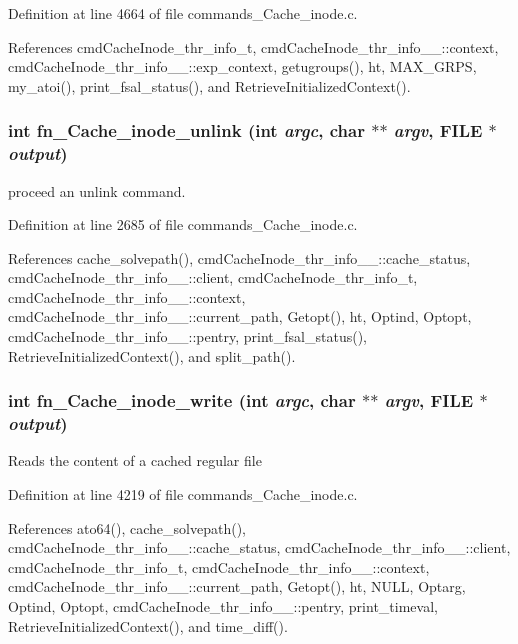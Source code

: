 Definition at line 4664 of file commands\_\-Cache\_\-inode.c.

References cmd\-Cache\-Inode\_\-thr\_\-info\_\-t, cmd\-Cache\-Inode\_\-thr\_\-info\_\-\_\-::context, cmd\-Cache\-Inode\_\-thr\_\-info\_\-\_\-::exp\_\-context, getugroups(), ht, MAX\_\-GRPS, my\_\-atoi(), print\_\-fsal\_\-status(), and Retrieve\-Initialized\-Context().
\subsubsection{\setlength{\rightskip}{0pt plus 5cm}int fn\_\-Cache\_\-inode\_\-unlink (int {\em argc}, char $\ast$$\ast$ {\em argv}, FILE $\ast$ {\em output})}\label{commands__Cache__inode_8c_a40}


proceed an unlink command. 

Definition at line 2685 of file commands\_\-Cache\_\-inode.c.

References cache\_\-solvepath(), cmd\-Cache\-Inode\_\-thr\_\-info\_\-\_\-::cache\_\-status, cmd\-Cache\-Inode\_\-thr\_\-info\_\-\_\-::client, cmd\-Cache\-Inode\_\-thr\_\-info\_\-t, cmd\-Cache\-Inode\_\-thr\_\-info\_\-\_\-::context, cmd\-Cache\-Inode\_\-thr\_\-info\_\-\_\-::current\_\-path, Getopt(), ht, Optind, Optopt, cmd\-Cache\-Inode\_\-thr\_\-info\_\-\_\-::pentry, print\_\-fsal\_\-status(), Retrieve\-Initialized\-Context(), and split\_\-path().
\subsubsection{\setlength{\rightskip}{0pt plus 5cm}int fn\_\-Cache\_\-inode\_\-write (int {\em argc}, char $\ast$$\ast$ {\em argv}, FILE $\ast$ {\em output})}\label{commands__Cache__inode_8c_a49}


Reads the content of a cached regular file 

Definition at line 4219 of file commands\_\-Cache\_\-inode.c.

References ato64(), cache\_\-solvepath(), cmd\-Cache\-Inode\_\-thr\_\-info\_\-\_\-::cache\_\-status, cmd\-Cache\-Inode\_\-thr\_\-info\_\-\_\-::client, cmd\-Cache\-Inode\_\-thr\_\-info\_\-t, cmd\-Cache\-Inode\_\-thr\_\-info\_\-\_\-::context, cmd\-Cache\-Inode\_\-thr\_\-info\_\-\_\-::current\_\-path, Getopt(), ht, NULL, Optarg, Optind, Optopt, cmd\-Cache\-Inode\_\-thr\_\-info\_\-\_\-::pentry, print\_\-timeval, Retrieve\-Initialized\-Context(), and time\_\-diff().
